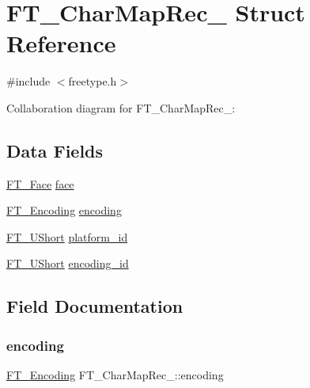 \hypertarget{struct_f_t___char_map_rec__}{}\section{F\+T\+\_\+\+Char\+Map\+Rec\+\_\+ Struct Reference}
\label{struct_f_t___char_map_rec__}


{\ttfamily \#include $<$freetype.\+h$>$}



Collaboration diagram for F\+T\+\_\+\+Char\+Map\+Rec\+\_\+\+:
\subsection*{Data Fields}
\begin{DoxyCompactItemize}
\item 
\hyperlink{freetype_8h_a7eba045ee20968354fa1bff0f69740fa}{F\+T\+\_\+\+Face} \hyperlink{struct_f_t___char_map_rec___a70a4e53e3f9818209916e5745c46dc28}{face}
\item 
\hyperlink{freetype_8h_a2c7f8d9834bb770d792cd8e0079f6835}{F\+T\+\_\+\+Encoding} \hyperlink{struct_f_t___char_map_rec___a88ee6f726ef11a8e6cc793d59ff5557e}{encoding}
\item 
\hyperlink{fttypes_8h_a937f6c17cf5ffd09086d8610c37b9f58}{F\+T\+\_\+\+U\+Short} \hyperlink{struct_f_t___char_map_rec___ae7f439996a8615698e780ce3c4f92457}{platform\+\_\+id}
\item 
\hyperlink{fttypes_8h_a937f6c17cf5ffd09086d8610c37b9f58}{F\+T\+\_\+\+U\+Short} \hyperlink{struct_f_t___char_map_rec___af10dd43eee8dc93e7d6191c663ae831a}{encoding\+\_\+id}
\end{DoxyCompactItemize}


\subsection{Field Documentation}
\mbox{\label{struct_f_t___char_map_rec___a88ee6f726ef11a8e6cc793d59ff5557e}} 
\subsubsection{\texorpdfstring{encoding}{encoding}}
{\footnotesize\ttfamily \hyperlink{freetype_8h_a2c7f8d9834bb770d792cd8e0079f6835}{F\+T\+\_\+\+Encoding} F\+T\+\_\+\+Char\+Map\+Rec\+\_\+\+::encoding}

